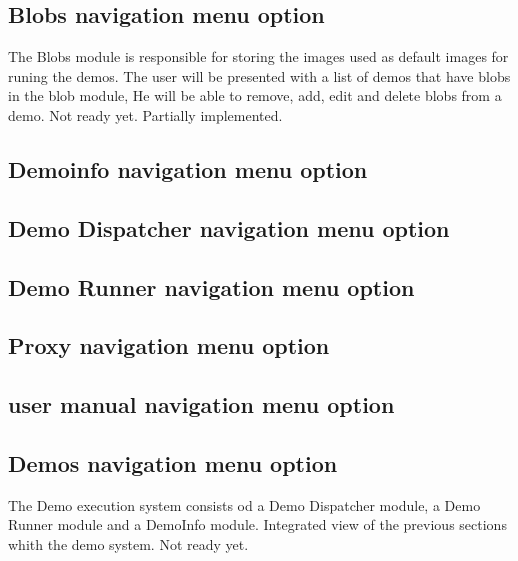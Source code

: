 \subsection{Blobs navigation menu option}
The Blobs module is responsible for storing the images used as default images for runing the demos.
The user will be presented with a list of demos that have blobs in the blob module,
He will be able to remove, add, edit and delete blobs from a demo.
Not ready yet. Partially implemented.

\subsection{Demoinfo navigation menu option}
\subsection{Demo Dispatcher navigation menu option}
\subsection{Demo Runner navigation menu option}
\subsection{Proxy navigation menu option}
\subsection{user manual navigation menu option}


\subsection{Demos navigation menu option}
The Demo execution system consists od a Demo Dispatcher module, a Demo Runner module and a DemoInfo module.
Integrated view of the previous sections whith the demo system.
Not ready yet.



